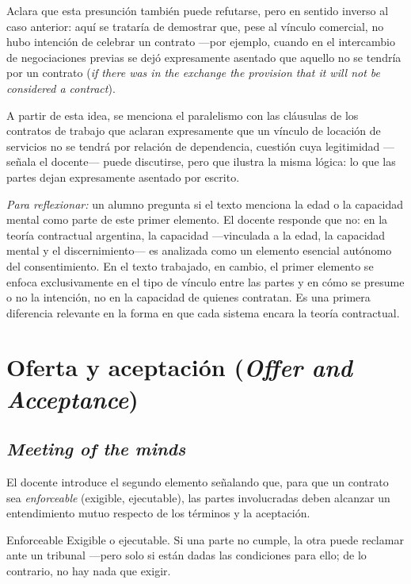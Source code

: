 \documentclass[12pt,oneside]{book}
\begin{document}
Aclara que esta presunción también puede refutarse, pero en sentido inverso al caso anterior: aquí se trataría de demostrar que, pese al vínculo comercial, no hubo intención de celebrar un contrato —por ejemplo, cuando en el intercambio de negociaciones previas se dejó expresamente asentado que aquello no se tendría por un contrato (\textit{if there was in the exchange the provision that it will not be considered a contract}).

A partir de esta idea, se menciona el paralelismo con las cláusulas de los contratos de trabajo que aclaran expresamente que un vínculo de locación de servicios no se tendrá por relación de dependencia, cuestión cuya legitimidad —señala el docente— puede discutirse, pero que ilustra la misma lógica: lo que las partes dejan expresamente asentado por escrito.

\begin{note}
\textit{Para reflexionar:} un alumno pregunta si el texto menciona la edad o la capacidad mental como parte de este primer elemento. El docente responde que no: en la teoría contractual argentina, la capacidad —vinculada a la edad, la capacidad mental y el discernimiento— es analizada como un elemento esencial autónomo del consentimiento. En el texto trabajado, en cambio, el primer elemento se enfoca exclusivamente en el tipo de vínculo entre las partes y en cómo se presume o no la intención, no en la capacidad de quienes contratan. Es una primera diferencia relevante en la forma en que cada sistema encara la teoría contractual.
\end{note}

\section{Oferta y aceptación (\textit{Offer and Acceptance})}

\subsection{\textit{Meeting of the minds}}

El docente introduce el segundo elemento señalando que, para que un contrato sea \textit{enforceable} (exigible, ejecutable), las partes involucradas deben alcanzar un entendimiento mutuo respecto de los términos y la aceptación.

\begin{definition}{Enforceable}
Exigible o ejecutable. Si una parte no cumple, la otra puede reclamar ante un tribunal —pero solo si están dadas las condiciones para ello; de lo contrario, no hay nada que exigir.
\end{definition}
\end{document}
